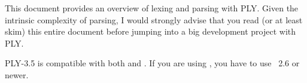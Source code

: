 \secdown
{}

This document provides an overview of lexing and parsing with PLY. Given the
intrinsic complexity of parsing, I would strongly advise that you read (or at
least skim) this entire document before jumping into a big development project
with PLY.

PLY-3.5 is compatible with both  and . If you are using , you
have to use \py\ 2.6 or newer.






\secup